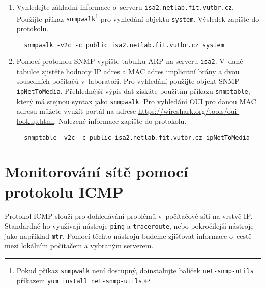 \documentclass[a4paper,11pt]{article}
\begin{document}
\begin{enumerate}
\item Vyhledejte základní informace o~serveru {\tt isa2.netlab.fit.vutbr.cz}.  Použijte příkaz {\tt snmpwalk}\footnote{Pokud příkaz {\tt snmpwalk} není dostupný, doinstalujte balíček \texttt{net-snmp-utils} příkazem \texttt{yum install net-snmp-utils}.} pro vyhledání objektu \texttt{system}. %
  Výsledek zapište do protokolu.
\begin{verbatim}
  snmpwalk -v2c -c public isa2.netlab.fit.vutbr.cz system
\end{verbatim}
\item Pomocí protokolu SNMP vypište tabulku ARP na serveru {\tt isa2}. V~dané tabulce zjistěte hodnoty IP adres a MAC adres implicitní brány a dvou sousedních počítačů v~laboratoři. Pro vyhledání použijte objekt SNMP \texttt{ipNetToMedia}. Přehlednější výpis dat získáte použitím příkazu \texttt{snmptable}, který má stejnou syntax jako \texttt{snmpwalk}. Pro vyhledání OUI pro danou MAC adresu můžete využít portál na adrese \url{https://wireshark.org/tools/oui-lookup.html}. Nalezené informace zapište do protokolu.
\begin{verbatim}
  snmptable -v2c -c public isa2.netlab.fit.vutbr.cz ipNetToMedia
\end{verbatim}
\end{enumerate}

\section{Monitorování sítě pomocí protokolu ICMP}
Protokol ICMP slouží pro dohledávání problémů v~počítačové síti na vrstvě IP. Standardně ho využívají nástroje \texttt{ping} a \texttt{traceroute}, nebo pokročilejší nástroje jako například \texttt{mtr}. Pomocí těchto nástrojů budeme zjišťovat informace o~cestě mezi lokálním počítačem a vybraným serverem.
\end{document}
